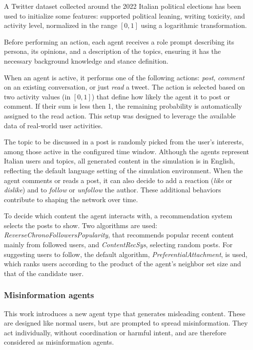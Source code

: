 A Twitter dataset collected around the 2022 Italian political elections \cite{pierri2023ita} has been used to initialize some features: supported political leaning, writing toxicity, and activity level, normalized in the range $[0,1]$ using a logarithmic transformation.

Before performing an action, each agent receives a role prompt describing its persona, its opinions, and a description of the topics, ensuring it has the necessary background knowledge and stance definition.


\medskip
When an agent is active, it performs one of the following actions: \textit{post}, \textit{comment} on an existing conversation, or just \textit{read} a tweet.
The action is selected based on two activity values (in $[0,1]$) that define how likely the agent it to post or comment.
If their sum is less then 1, the remaining probability is automatically assigned to the read action.
This setup was designed to leverage the available data of real-world user activities.

The topic to be discussed in a post is randomly picked from the user's interests, among those active in the configured time window.
Although the agents represent Italian users and topics, all generated content in the simulation is in English, reflecting the default language setting of the simulation environment.
When the agent comments or reads a post, it can also decide to add a reaction (\textit{like} or \textit{dislike}) and to \textit{follow} or \textit{unfollow} the author.
These additional behaviors contribute to shaping the network over time.

To decide which content the agent interacts with, a recommendation system selects the posts to show. Two algorithms are used: \textit{ReverseChronoFollowersPopularity}, that recommends popular recent content mainly from followed users, and \textit{ContentRecSys}, selecting random posts.
For suggesting users to follow, the default algorithm, \textit{PreferentialAttachment}, is used, which ranks users according to the product of the agent’s neighbor set size and that of the candidate user.


\subsubsection{Misinformation agents}
This work introduces a new agent type that generates misleading content.
These are designed like normal users, but are prompted to spread misinformation.
They act individually, without coordination or harmful intent, and are therefore considered as misinformation agents.

